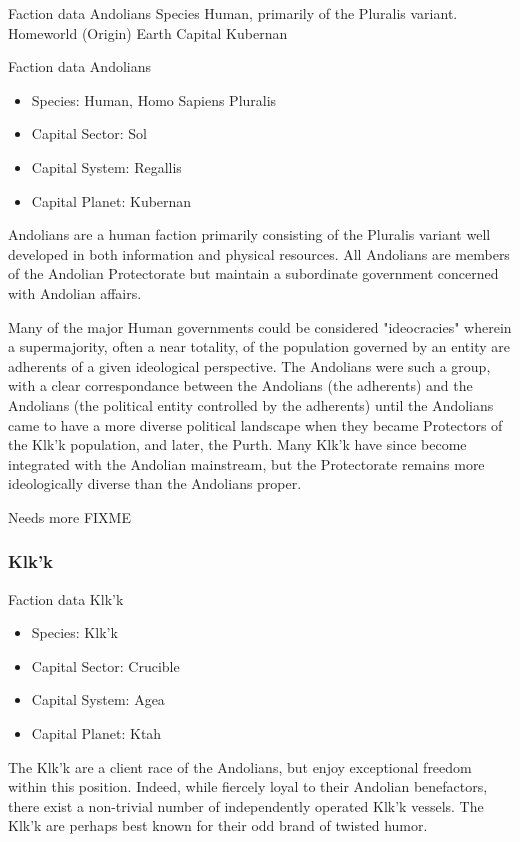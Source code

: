 Faction data 
Andolians 
Species 	Human, primarily of the Pluralis variant. 
Homeworld (Origin) 	Earth 
Capital 	Kubernan 

Faction data Andolians
\begin{itemize}
\item Species: Human, Homo Sapiens Pluralis
\item Capital Sector: Sol
\item Capital System: Regallis
\item Capital Planet: Kubernan
\end{itemize}

Andolians are a human faction primarily consisting of the Pluralis
variant well developed in both information and physical resources. All
Andolians are members of the Andolian Protectorate but maintain a
subordinate government concerned with Andolian affairs.

Many of the major Human governments could be considered "ideocracies"
wherein a supermajority, often a near totality, of the population
governed by an entity are adherents of a given ideological
perspective. The Andolians were such a group, with a clear
correspondance between the Andolians (the adherents) and the Andolians
(the political entity controlled by the adherents) until the Andolians
came to have a more diverse political landscape when they became
Protectors of the Klk'k population, and later, the Purth. Many Klk'k
have since become integrated with the Andolian mainstream, but the
Protectorate remains more ideologically diverse than the Andolians
proper.

Needs more FIXME 

\subsubsection{Klk'k}

Faction data Klk'k
\begin{itemize}
\item Species: Klk'k 
\item Capital Sector: Crucible
\item Capital System: Agea
\item Capital Planet: Ktah
\end{itemize}

The Klk'k are a client race of the Andolians, but enjoy exceptional
freedom within this position. Indeed, while fiercely loyal to their
Andolian benefactors, there exist a non-trivial number of
independently operated Klk'k vessels. The Klk'k are perhaps best known
for their odd brand of twisted humor.

